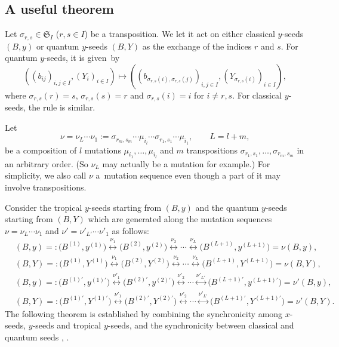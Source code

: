 \documentclass[pdftex]{sigma}
\newcommand\bY{Y}
\numberwithin{equation}{section}
\begin{document}
\subsection{A useful theorem}

Let $\sigma_{r,s} \in \mathfrak{S}_I$ ($r, s \in I$) be a transposition.
We let it act on either classical $y$-seeds $(B,y)$ or quantum $y$-seeds $(B,Y)$
as the exchange of the indices $r$ and $s$. For quantum $y$-seeds, it
is given~by
\begin{equation}\label{qys}
((b_{ij})_{i,j\in I} , (Y_i)_{i \in I} ) \mapsto
((b_{\sigma_{r,s}(i), \sigma_{r,s}(j)})_{i,j\in I}, (Y_{\sigma_{r,s}(i)})_{i \in I} ),
\end{equation}
where $\sigma_{r,s}(r) = s$, $\sigma_{r,s}(s)=r$ and
$\sigma_{r,s}(i) = i$ for $i \neq r,s$. For classical $y$-seeds, the
rule is similar.

Let
\begin{equation}\label{nuL}
\nu = \nu_L\dotsm \nu_1 := \sigma_{r_m,s_m} \dotsm
\mu_{i_l} \dotsm \sigma_{r_1,s_1} \dotsm \mu_{i_1}, \qquad L = l+m,
\end{equation}
be a composition of $l$ mutations $\mu_{i_1}, \dots, \mu_{i_l}$ and
$m$ transpositions $\sigma_{r_1,s_1}, \dots, \sigma_{r_m, s_m}$ in
an arbitrary order. (So $\nu_L$ may actually be a mutation for
example.) For simplicity, we also call $\nu$ a~mutation sequence even
though a part of it may involve transpositions.

Consider the tropical $y$-seeds starting from $(B,y)$ and the quantum
$y$-seeds starting from $(B,Y)$ which are generated along the mutation
sequences $\nu=\nu_L\dotsm \nu_1$ and $\nu'= \nu'_{L'} \dotsm \nu'_1$
as follows:
\begin{align}%
\label{seq0}
&(B,y) =:\bigl(B^{(1)},y^{(1)}\bigr) \stackrel{\nu_1}{\longleftrightarrow}
\bigl(B^{(2)},y^{(2)}\bigr) \stackrel{\nu_2}{\longleftrightarrow}
\dotsb
\stackrel{\nu_L}{\longleftrightarrow} \bigl(B^{(L+1)},y^{(L+1)}\bigr) = \nu(B,y),
\\
&(B,\bY) =:\bigl(B^{(1)},\bY^{(1)}\bigr) \stackrel{\nu_1}{\longleftrightarrow}
\bigl(B^{(2)},\bY^{(2)}\bigr) \stackrel{\nu_2}{\longleftrightarrow}
\dotsb
\stackrel{\nu_L}{\longleftrightarrow} \bigl(B^{(L+1)},\bY^{(L+1)}\bigr) = \nu(B,Y),
\\
&(B,y) =:\bigl(B^{(1)\prime },y^{(1)\prime}\bigr) \stackrel{\nu'_1}{\longleftrightarrow}
\bigl(B^{(2)\prime},y^{(2)\prime}\bigr) \stackrel{\nu'_2}{\longleftrightarrow}
\dotsb
\stackrel{\nu'_{L'}}{\longleftrightarrow} \bigl(B^{(L+1)\prime},y^{(L+1)\prime}\bigr) = \nu'(B,y),
\\
&(B,\bY) =:\bigl(B^{(1)\prime},\bY^{(1)\prime}\bigr) \!\stackrel{\nu'_1}{\longleftrightarrow}\!
\bigl(B^{(2)\prime},\bY^{(2)\prime}\bigr) \!\stackrel{\nu'_2}{\longleftrightarrow}
\dotsb
\stackrel{\nu'_{L'}}{\longleftrightarrow} \!\bigl(B^{(L+1)\prime},\bY^{(L+1)\prime}\bigr) = \nu'(B,Y).\!\!\!
\label{seq3}
\end{align}
The following theorem is established by combining the synchronicity \cite{N21}
among $x$-seeds, $y$-seeds and tropical $y$-seeds,
and the synchronicity between classical and quantum seeds
\cite[Lemma 2.22]{FG09b}, \cite[Proposition~3.4]{KN11}.
\end{document}
